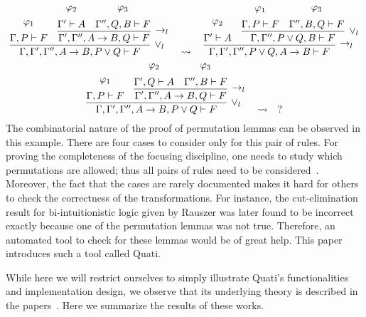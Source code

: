 \documentclass{llncs}
\begin{document}
{\scriptsize
\[
\infer[\vee_l]{\Gamma, \Gamma', \Gamma'', A \rightarrow B , P \vee Q \vdash F}{
  \deduce{\Gamma, P \vdash F}{\varphi_1\vspace{0.2cm}}
  &
  \infer[\rightarrow_l]{\Gamma', \Gamma'', A \rightarrow B , Q \vdash F}{
    \deduce{\Gamma' \vdash A}{\varphi_2\vspace{0.2cm}}
    &
    \deduce{\Gamma'', Q, B \vdash F}{\varphi_3\vspace{0.2cm}}
  }
}
\quad\rightsquigarrow\quad
\infer[\rightarrow_l]{\Gamma, \Gamma', \Gamma'', P \vee Q, A \rightarrow B
\vdash F}{
  \deduce{\Gamma' \vdash A}{\varphi_2\vspace{0.2cm}}
  &
  \infer[\vee_l]{\Gamma, \Gamma'', P \vee Q, B \vdash F}{
    \deduce{\Gamma, P \vdash F}{\varphi_1\vspace{0.2cm}}
    &
    \deduce{\Gamma'', B, Q \vdash F}{\varphi_3\vspace{0.2cm}}
  }
}
\]
}
{\scriptsize
\[
\infer[\vee_l]{\Gamma, \Gamma', \Gamma'', A \rightarrow B , P \vee Q \vdash F}{
  \deduce{\Gamma, P \vdash F}{\varphi_1\vspace{0.2cm}}
  &
  \infer[\rightarrow_l]{\Gamma', \Gamma'', A \rightarrow B , Q \vdash F}{
    \deduce{\Gamma', Q \vdash A}{\varphi_2\vspace{0.2cm}}
    &
    \deduce{\Gamma'', B \vdash F}{\varphi_3\vspace{0.2cm}}
  }
}
\quad\rightsquigarrow\quad
?
\]
}%
The combinatorial nature of the proof of permutation lemmas can be observed in
this example. There are four cases to consider only for this pair of rules. For
proving the completeness of the focusing discipline, one needs to study which
permutations are allowed; thus all pairs of rules need to be
considered~\cite{miller07cslb}.
Moreover, the fact that the cases are rarely documented makes it hard for others to check the
correctness of the transformations. For instance, the cut-elimination result for
bi-intuitionistic logic given by Rauszer \cite{rauszer74studia}
was later found to be incorrect \cite{crolard01tcs} exactly because one of the
permutation lemmas was not true. Therefore, an automated tool to check for these lemmas
would be of great help. This paper introduces such a tool called Quati.

While here we will restrict ourselves to simply illustrate Quati's
functionalities and implementation design, we observe that its underlying theory
is described in the papers~\cite{nigam.jlc,nigam13iclp,nigam14ebl}. Here we
summarize the results of these works.  
 
\end{document}
